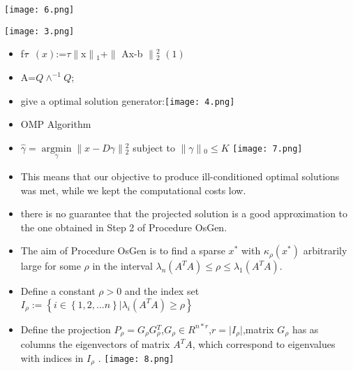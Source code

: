\documentclass{beamer}
\begin{document}
\begin{frame}
		\texttt{[image: 6.png]}
\end{frame}

\begin{frame}
		\texttt{[image: 3.png]}
\end{frame}

\begin{frame}
	\begin{itemize}
			\item f${\small\tau}$ $\left( x \right)$:=$\tau\parallel$x$\parallel{_1}$+$\parallel$ Ax-b $\parallel{_2^2}$ $\left(1\right)$
			\item A=$Q\wedge^{-1}Q$;
			\item give a optimal solution generator:\texttt{[image: 4.png]}
	\end{itemize}
\end{frame}

\begin{frame}
	\begin{itemize}
		\item OMP Algorithm
		\item $\widehat{\gamma} =\mathop{\arg\min}\limits_{\gamma}\|x-D\gamma\|{_2^2}$ subject to $\|\gamma\|{_0}\leq K$
		\texttt{[image: 7.png]}
	\end{itemize}
\end{frame}

\begin{frame}
	\begin{itemize}
		\item This means that our objective to produce ill-conditioned optimal solutions was met, while we kept the computational costs low.
		\item there is no guarantee that the projected solution is a good approximation to the one obtained in Step 2 of Procedure OsGen.
	\end{itemize}
\end{frame}

\begin{frame}
	\begin{itemize}
		\item The aim of Procedure OsGen is to find a sparse $x{^*}$ with $ \kappa_{\rho}\left(x{^*}\right)$ arbitrarily large for some $\rho$ in the interval $\lambda_{n}(A^T A)\leq \rho \leq\lambda_{1}(A^T A)$.
		\item Define a constant $\rho>0$ and the index set $I_\rho :=\left\lbrace i \in\left\lbrace 1,2,...n \right\rbrace \vert \lambda_{i}(A^T A)\geq \rho \right\rbrace$
		\item Define the projection $P_\rho =G{_\rho}G{_\rho ^T}$,$G{_\rho}\in R^{n*r}$,$r=\vert I_\rho\vert$,matrix $G{_\rho}$ has as columns the eigenvectors of matrix $A^TA$, which correspond to eigenvalues with indices in $I_\rho$ .
		\texttt{[image: 8.png]}
	\end{itemize}
\end{frame}
\end{document}
